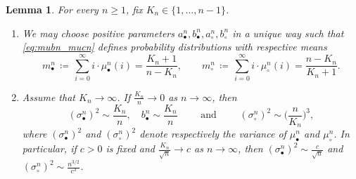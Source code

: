 \documentclass[11pt]{article}
\newtheorem{lemma}[theo]{Lemma}
\theoremstyle{definition}
\numberwithin{equation}{section}
\numberwithin{figure}{section}
\numberwithin{table}{section}
\def\abn{a_{\bullet}^{n}}
\def\acn{a_{\circ}^{n}}
\def\bbn{b_{\bullet}^{n}}
\def\bcn{b_{\circ}^{n}}
\def\mubn{\mu_{\bullet}^{n}}
\def\mucn{\mu_{\circ}^{n}}
\def\scn{\sigma_{\circ}^{n}}
\def\sbn{\sigma_{\bullet}^{n}}
\begin{document}
\begin{lemma}\label{lem:exist} For every $n \ge 1$,  fix $K_{n} \in \{1,\dots,n-1\}$.
\begin{enumerate}
  \item[(i)] We may choose positive parameters  $\abn,\bbn,\acn,\bcn$ in a unique way  such that \eqref{eq:mubn_mucn}
defines probability distributions with respective means
\[m^{n}_{\bullet}  \, \coloneqq  \, \sum_{i=0}^{\infty} i \cdot \mubn(i)= \frac{K_{n}+1}{n-K_{n}}, \qquad m^{n}_{\circ} \, \coloneqq \, \sum_{i=0}^{\infty} i \cdot \mucn(i)= \frac{n-K_{n}}{K_{n}+1}.\]
\item[(ii)] Assume that $K_{n} \rightarrow \infty$. If $\tfrac{K_{n}}{n} \rightarrow 0$ as $n \rightarrow \infty$, then
\[(\sbn)^{2} \sim \frac{K_{n}}{n}, \quad  \bbn \sim \frac{K_{n}}{n}  \qquad \text{ and } \qquad  (\scn)^{2} \sim   \big( \frac{n}{K_{n}} \big)^{3},\]
where $(\sbn)^{2}$ and $(\scn)^{2}$ denote respectively the variance of $\mubn$ and $\mucn$.
In particular, if $c>0$ is fixed and $\tfrac{K_{n}}{\sqrt{n}} \rightarrow c$ as $n \rightarrow \infty$, then   $ (\sbn)^{2} \sim \tfrac{c}{\sqrt{n}}$ and $(\scn)^{2} \sim  \frac{n^{3/2}}{c^{3}}$.
\end{enumerate}
\end{lemma}
\end{document}
